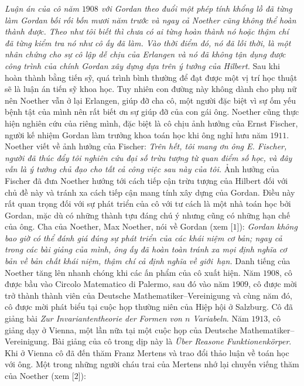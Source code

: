 \begin{multicols}{2}
	\vskip 0.05cm
	\textit{Luận án của cô năm $1908$ với Gordan theo đuổi một phép tính khổng lồ đã từng làm Gordan bối rối bốn mươi năm trước và ngay cả Noether cũng không thể hoàn thành được. Theo như tôi biết thì chưa có ai từng hoàn thành nó hoặc thậm chí đã từng kiểm tra nó như cô ấy đã làm. Vào thời điểm đó, nó đã lỗi thời, là một nhân chứng cho sự cô lập dễ chịu của Erlangen và  nó đã không tận dụng được công trình của chính Gordan xây dựng dựa trên ý tưởng của Hilbert.}
	\vskip 0.05cm
	Sau khi hoàn thành bằng tiến sỹ, quá trình bình thường để đạt được một vị trí học thuật sẽ là luận án tiến sỹ khoa học. Tuy nhiên con đường này không dành cho phụ nữ nên Noether vẫn ở lại Erlangen, giúp đỡ cha cô, một người đặc biệt vì sự ốm yếu bệnh tật của mình nên rất biết ơn sự giúp đỡ của con gái ông. Noether cũng thực hiện nghiên cứu của riêng mình, đặc biệt là cô chịu ảnh hưởng của Ernst Fischer, người kế nhiệm Gordan làm trưởng khoa toán học khi ông nghỉ hưu năm $1911$. Noether viết về ảnh hưởng của Fischer:
	\vskip 0.05cm
	\textit{Trên hết, tôi mang ơn ông E. Fischer, người đã thúc đẩy tôi nghiên cứu đại số trừu tượng từ quan điểm số học, và đây vẫn là ý tưởng chủ đạo cho tất cả công việc sau này của tôi.}
	\vskip 0.05cm
	Ảnh hưởng của Fischer đã đưa Noether hướng tới cách tiếp cận trừu tượng của Hilbert đối với chủ đề này và tránh xa cách tiếp cận mang tính xây dựng của Gordan. Điều này rất quan trọng đối với sự phát triển của cô với tư cách là một nhà toán học bởi  Gordan, mặc dù có những thành tựu đáng chú ý nhưng cũng có những hạn chế của ông. Cha của Noether, Max Noether, nói về Gordan (xem [$1$]):
	\vskip 0.05cm
	\textit{Gordan không bao giờ có thể đánh giá đúng sự phát triển của các khái niệm cơ bản; ngay cả trong các bài giảng của mình, ông ấy đã hoàn toàn tránh xa mọi định nghĩa cơ bản về bản chất khái niệm, thậm chí cả định nghĩa về giới~hạn.}
	\vskip 0.05cm
	Danh tiếng của Noether tăng lên nhanh chóng khi các ấn phẩm của cô xuất hiện. Năm $1908$, cô được bầu vào Circolo Matematico di Palermo, sau đó vào năm $1909$, cô được mời trở thành thành viên của Deutsche Mathematiker--Vereinigung và cùng năm đó, cô được mời phát biểu tại cuộc họp thường niên của Hiệp hội ở Salzburg. Cô đã giảng bài \textit{Zur Invariantentheorie der Formen von $n$ Variabeln}. Năm $1913$, cô giảng dạy ở Vienna, một lần nữa tại một cuộc họp của Deutsche Mathematiker--Vereinigung. Bài giảng của cô trong dịp này là \textit{Über Reasone Funktionenkörper}. Khi ở Vienna cô đã đến thăm Franz Mertens và trao đổi thảo luận về toán học với ông. Một trong những người cháu trai của Mertens nhớ lại chuyến viếng thăm của Noether (xem [$2$]):

\end{multicols}
